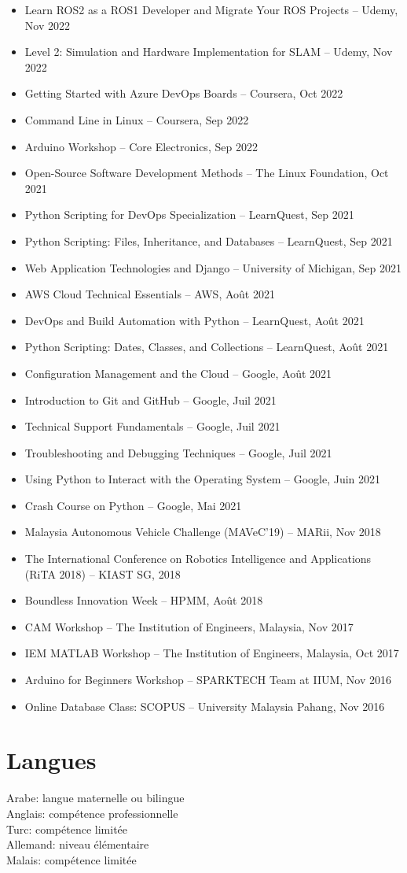 \documentclass[11pt,a4paper]{article}
\begin{document}
\begin{itemize}
    \item Learn ROS2 as a ROS1 Developer and Migrate Your ROS Projects -- Udemy, Nov 2022
    \item Level 2: Simulation and Hardware Implementation for SLAM -- Udemy, Nov 2022
    \item Getting Started with Azure DevOps Boards -- Coursera, Oct 2022
    \item Command Line in Linux -- Coursera, Sep 2022
    \item Arduino Workshop -- Core Electronics, Sep 2022
    \item Open-Source Software Development Methods -- The Linux Foundation, Oct 2021
    \item Python Scripting for DevOps Specialization -- LearnQuest, Sep 2021
    \item Python Scripting: Files, Inheritance, and Databases -- LearnQuest, Sep 2021
    \item Web Application Technologies and Django -- University of Michigan, Sep 2021
    \item AWS Cloud Technical Essentials -- AWS, Août 2021
    \item DevOps and Build Automation with Python -- LearnQuest, Août 2021
    \item Python Scripting: Dates, Classes, and Collections -- LearnQuest, Août 2021
    \item Configuration Management and the Cloud -- Google, Août 2021
    \item Introduction to Git and GitHub -- Google, Juil 2021
    \item Technical Support Fundamentals -- Google, Juil 2021
    \item Troubleshooting and Debugging Techniques -- Google, Juil 2021
    \item Using Python to Interact with the Operating System -- Google, Juin 2021
    \item Crash Course on Python -- Google, Mai 2021
    \item Malaysia Autonomous Vehicle Challenge (MAVeC'19) -- MARii, Nov 2018
    \item The International Conference on Robotics Intelligence and Applications (RiTA 2018) -- KIAST SG, 2018
    \item Boundless Innovation Week -- HPMM, Août 2018
    \item CAM Workshop -- The Institution of Engineers, Malaysia, Nov 2017
    \item IEM MATLAB Workshop -- The Institution of Engineers, Malaysia, Oct 2017
    \item Arduino for Beginners Workshop -- SPARKTECH Team at IIUM, Nov 2016
    \item Online Database Class: SCOPUS -- University Malaysia Pahang, Nov 2016
\end{itemize}

\section*{Langues}

Arabe: langue maternelle ou bilingue\\
Anglais: compétence professionnelle\\
Turc: compétence limitée\\
Allemand: niveau élémentaire\\
Malais: compétence limitée
\end{document}
